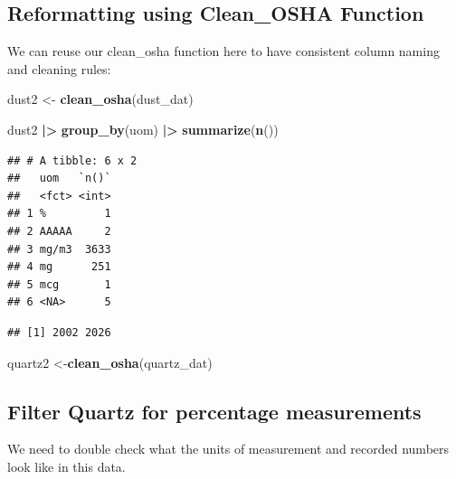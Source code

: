\documentclass[
]{article}
\newenvironment{Shaded}{\begin{snugshade}}{\end{snugshade}}
\newcommand{\FunctionTok}[1]{\textcolor[rgb]{0.13,0.29,0.53}{\textbf{#1}}}
\newcommand{\NormalTok}[1]{#1}
\newcommand{\OtherTok}[1]{\textcolor[rgb]{0.56,0.35,0.01}{#1}}
\newcommand{\SpecialCharTok}[1]{\textcolor[rgb]{0.81,0.36,0.00}{\textbf{#1}}}
\begin{document}
\subsection{Reformatting using Clean\_OSHA
Function}\label{reformatting-using-clean_osha-function}

We can reuse our clean\_osha function here to have consistent column
naming and cleaning rules:

\begin{Shaded}
\begin{Highlighting}[]
\NormalTok{dust2 }\OtherTok{\textless{}{-}} \FunctionTok{clean\_osha}\NormalTok{(dust\_dat) }
  
\NormalTok{dust2 }\SpecialCharTok{|\textgreater{}} 
  \FunctionTok{group\_by}\NormalTok{(uom) }\SpecialCharTok{|\textgreater{}} 
  \FunctionTok{summarize}\NormalTok{(}\FunctionTok{n}\NormalTok{()) }
\end{Highlighting}
\end{Shaded}

\begin{verbatim}
## # A tibble: 6 x 2
##   uom   `n()`
##   <fct> <int>
## 1 %         1
## 2 AAAAA     2
## 3 mg/m3  3633
## 4 mg      251
## 5 mcg       1
## 6 <NA>      5
\end{verbatim}

\begin{Shaded}
\end{Shaded}

\begin{verbatim}
## [1] 2002 2026
\end{verbatim}

\begin{Shaded}
\begin{Highlighting}[]
\NormalTok{quartz2 }\OtherTok{\textless{}{-}}\FunctionTok{clean\_osha}\NormalTok{(quartz\_dat)}
\end{Highlighting}
\end{Shaded}

\subsection{Filter Quartz for percentage
measurements}\label{filter-quartz-for-percentage-measurements}

We need to double check what the units of measurement and recorded
numbers look like in this data.
\end{document}
